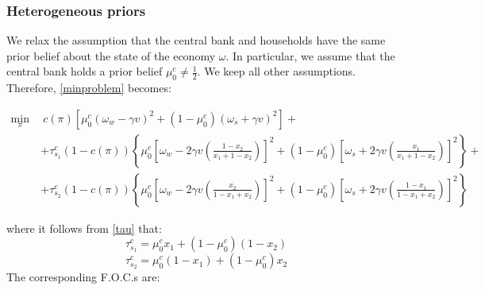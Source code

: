 \documentclass[12pt,a4paper]{article}
\begin{document}
\subsubsection{Heterogeneous priors}
We relax the assumption that the central bank and households have the same prior belief about the state of the economy $\omega$. In particular, we assume that the central bank holds a prior belief $\mu_0^c\neq \frac{1}{2}$. We keep all other assumptions. Therefore, \eqref{minproblem} becomes:
\begin{small}
    \begin{equation}
    \begin{split}
    \min_{\pi} \ & \ c(\pi)\left[\mu_0^c(\omega_w-\gamma v)^2+(1-\mu_0^c)(\omega_s+\gamma v)^2\right]+\\
     &  +\tau_{s_1}^c(1-c(\pi))\left\{\mu_0^c\left[\omega_w-2\gamma v\left(\frac{1-x_2}{x_1+1-x_2}\right)\right]^2+(1-\mu_0^c)\left[\omega_s+2\gamma v\left(\frac{x_1}{x_1+1-x_2}\right)\right]^2\right\}+ \\
     & +\tau_{s_2}^c(1-c(\pi))\left\{\mu_0^c\left[\omega_w-2\gamma v\left(\frac{x_2}{1-x_1+x_2}\right)\right]^2+(1-\mu_0^c)\left[\omega_s+2\gamma v\left(\frac{1-x_1}{1-x_1+x_2}\right)\right]^2\right\}
    \end{split}
    \label{opt_heterogeneous_priors}
    \end{equation}
\end{small}
where it follows from \eqref{tau} that:
\begin{equation}
    \tau_{s_1}^c=\mu_0^c x_1 + (1-\mu_0^c)(1-x_2)
\end{equation}
\begin{equation}
    \tau_{s_2}^c=\mu_0^c (1-x_1) + (1-\mu_0^c)x_2
\end{equation}
The corresponding F.O.C.s are:
\end{document}
